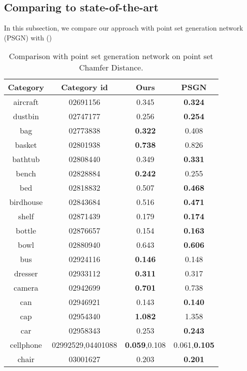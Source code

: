 \subsection{Comparing to state-of-the-art}
In this subsection, we compare our approach with point set generation network (PSGN)\cite{PSGN} 
with (\cite{3Drender})
\begin{table}
	\caption{Comparison with point set generation network on point set Chamfer Distance. }
	\label{tab:seg}
	\centering
	\begin{tabular}{c c c c}
		Category & Category id & Ours & PSGN\cite{PSGN} \\
		\hline
		aircraft & 02691156 & 0.345 & {\color{blue} \textbf{0.324}}\\   
		dustbin & 02747177 & 0.256 & {\color{blue} \textbf{0.254}}\\
		bag & 02773838  & {\color{blue} \textbf{0.322}} & 0.408\\
		basket & 02801938 & {\color{blue}\textbf{0.738}} & 0.826\\
		bathtub & 02808440 & 0.349 & {\color{blue}\textbf{0.331}}\\
		bench & 02828884 & {\color{blue}\textbf{0.242}} & 0.255\\
		bed & 02818832 & 0.507 & {\color{blue}\textbf{0.468}}\\
		birdhouse & 02843684 & 0.516 & {\color{blue}\textbf{0.471}}\\
		shelf & 02871439 & 0.179 & {\color{blue}\textbf{0.174}}\\
		bottle & 02876657 & 0.154 & {\color{blue}\textbf{0.163}}\\
		bowl & 02880940 & 0.643 & {\color{blue}\textbf{0.606}}\\
		bus & 02924116 & {\color{blue}\textbf{0.146}} & 0.148\\
		dresser & 02933112 & {\color{blue}\textbf{0.311}} & 0.317\\
		camera & 02942699 & {\color{blue}\textbf{0.701}} & 0.738\\
		can & 02946921 & 0.143 & {\color{blue}\textbf{0.140}}\\
		cap & 02954340 & {\color{blue} \textbf{1.082}} & 1.358\\
		car & 02958343 & 0.253 & {\color{blue} \textbf{0.243}}\\
		cellphone & 02992529,04401088 & {\color{blue}\textbf{0.059}},0.108 & 0.061,{\color{blue}\textbf{0.105}}\\
		chair & 03001627 & 0.203 & {\color{blue}\textbf{0.201}}\\

\end{tabular}
\end{table}
